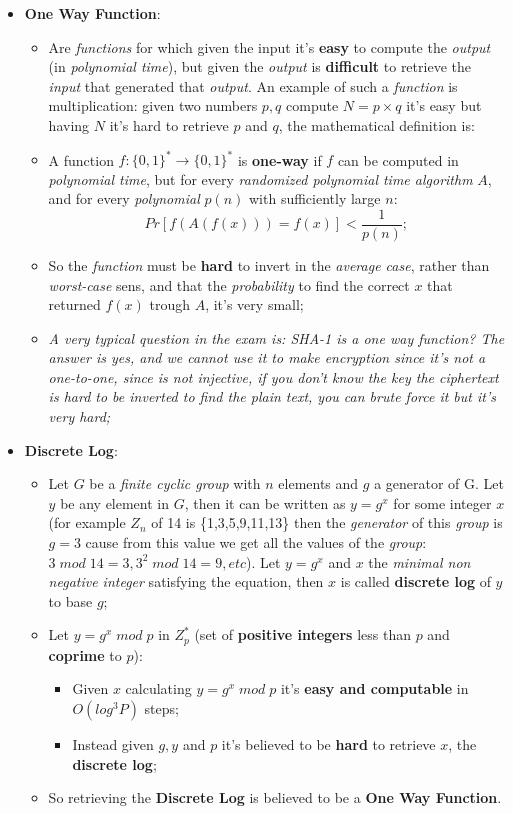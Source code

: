 \documentclass{article}
\begin{document}
\begin{itemize}
\item \textbf{One Way Function}:
\begin{itemize}
\item Are \emph{functions} for which given the input it's \textbf{easy} to compute the \emph{output} (in \emph{polynomial time}), but given the \emph{output} is \textbf{difficult} to retrieve the \emph{input} that generated that \emph{output}. An example of such a \emph{function} is multiplication: given two numbers $p,q$ compute $N=p\times q$ it's easy but having $N$ it's hard to retrieve $p$ and $q$, the mathematical definition is:
\item A function $f: \{0,1\}^{*} \rightarrow \{0,1\}^{*}$ is \textbf{one-way} if $f$ can be computed in \emph{polynomial time}, but for every \emph{randomized polynomial time algorithm} $A$, and for every \emph{polynomial} $p(n)$ with sufficiently large $n$:
\[ Pr \left [ f(A(f(x))) = f(x) \right ] < \frac{1}{p(n)}; \]
\item So the \emph{function} must be \textbf{hard} to invert in the \emph{average case}, rather than \emph{worst-case} sens, and that the \emph{probability} to find the correct $x$ that returned $f(x)$ trough $A$, it's very small;
\item \emph{A very typical question in the exam is: SHA-1 is a one way function? The answer is yes, and we cannot use it to make encryption since it's not a one-to-one, since is not injective, if you don't know the key the ciphertext is hard to be inverted to find the plain text, you can brute force it but it's very hard;}
\end{itemize}
\item \textbf{Discrete Log}:
\begin{itemize}
\item Let $G$ be a \emph{finite cyclic group} with $n$ elements and $g$ a generator of G. Let $y$ be any element in $G$, then it can be written as $y= g^x$ for some integer $x$ (for example $Z_n$ of 14 is \{1,3,5,9,11,13\} then the \emph{generator} of this \emph{group} is $g=3$ cause from this value we get all the values of the \emph{group}: $3\; mod \;14 = 3, 3^2\; mod\; 14 = 9, etc$). Let $y = g^x$ and $x$ the \emph{minimal non negative integer} satisfying the equation, then $x$ is called \textbf{discrete log} of $y$ to base $g$;
\item Let $y= g^x\;mod\; p$ in $Z_p^{*}$ (set of \textbf{positive integers} less than $p$ and \textbf{coprime} to $p$):
\begin{itemize}
\item Given $x$ calculating $y= g^x\; mod\; p$ it's \textbf{easy and computable} in $O(log^3 P)$ steps;
\item Instead given $g, y$ and $p$ it's believed to be \textbf{hard} to retrieve $x$, the \textbf{discrete log};
\end{itemize}
\item So retrieving the \textbf{Discrete Log} is believed to be a \textbf{One Way Function}. 
\end{itemize}
\end{itemize}
\end{document}
